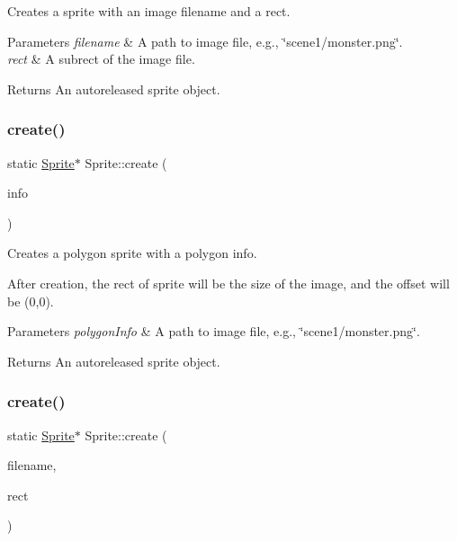 Creates a sprite with an image filename and a rect.


\begin{DoxyParams}{Parameters}
{\em filename} & A path to image file, e.\+g., \char`\"{}scene1/monster.\+png\char`\"{}. \\
\hline
{\em rect} & A subrect of the image file. \\
\hline
\end{DoxyParams}
\begin{DoxyReturn}{Returns}
An autoreleased sprite object. 
\end{DoxyReturn}
\mbox{\label{classSprite_ae388510394459cfefdeacc96db7c7d5c}} 
\subsubsection{\texorpdfstring{create()}{create()}\hspace{0.1cm}{\footnotesize\ttfamily [7/8]}}
{\footnotesize\ttfamily static \hyperlink{classSprite}{Sprite}$\ast$ Sprite\+::create (\begin{DoxyParamCaption}\item[{const \hyperlink{classPolygonInfo}{Polygon\+Info} \&}]{info }\end{DoxyParamCaption})\hspace{0.3cm}{\ttfamily [static]}}

Creates a polygon sprite with a polygon info.

After creation, the rect of sprite will be the size of the image, and the offset will be (0,0).


\begin{DoxyParams}{Parameters}
{\em polygon\+Info} & A path to image file, e.\+g., \char`\"{}scene1/monster.\+png\char`\"{}. \\
\hline
\end{DoxyParams}
\begin{DoxyReturn}{Returns}
An autoreleased sprite object. 
\end{DoxyReturn}
\mbox{\label{classSprite_a5568c826d13031d153f6321c4bce1eca}} 
\subsubsection{\texorpdfstring{create()}{create()}\hspace{0.1cm}{\footnotesize\ttfamily [8/8]}}
{\footnotesize\ttfamily static \hyperlink{classSprite}{Sprite}$\ast$ Sprite\+::create (\begin{DoxyParamCaption}\item[{const std\+::string \&}]{filename,  }\item[{const \hyperlink{classRect}{Rect} \&}]{rect }\end{DoxyParamCaption})\hspace{0.3cm}{\ttfamily [static]}}

